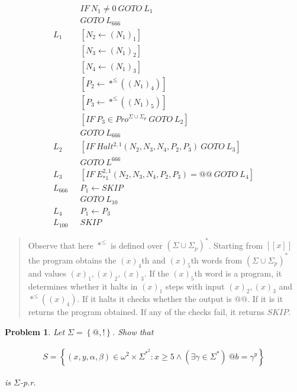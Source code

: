 \documentclass[a4paper, 12pt]{article}
\newtheorem{problem}{Problem}
\newtheorem{problem}{Problem}
\begin{document}
\footnotesize 
\begin{align*}
    &IF~ N_1 \neq 0 ~ GOTO ~ L_1 \\ 
    &GOTO ~ L_{666} \\ 
    L_1 ~ ~ ~&[N_2 \leftarrow  (N_1)_1] \\ 
    &[N_3 \leftarrow  (N_1)_2] \\ 
    &[N_4 \leftarrow  (N_1)_3] \\ 
    &[P_2 \leftarrow  *^{\leq}( (N_1)_4 )] \\ 
    &[P_3 \leftarrow  *^{\leq}( (N_1)_5 )] \\ 
    &[IF ~ P_3 \in Pro^{\Sigma \cup \Sigma_p} ~ GOTO ~ L_2] \\ 
    &GOTO ~ L_{666} \\ 
    L_2 ~ ~ ~ &[IF ~ Halt^{2, 1}(N_2, N_3, N_4, P_2, P_3) ~ GOTO ~ L_3]\\ 
    &GOTO ~ L^{666}\\
    L_3 ~ ~ ~&[IF ~ E_{* 1}^{2, 1}(N_2, N_3, N_4, P_2, P_3) = @@ ~ GOTO ~ L_4]
    \\ 
    L_{666} ~ ~ ~ &P_1 \leftarrow SKIP \\ 
              &GOTO ~ L_{10} \\ 
    L_4 ~ ~ ~ & P_1 \leftarrow P_3 \\ 
    L_{100} ~ ~ ~ &SKIP
\end{align*}

\normalsize


\small
\begin{quote}

    Observe that here $*^{\leq}$ is defined over $(\Sigma \cup \Sigma_p)^*$.
    Starting from $[\![ x ]\!]$ the
    program obtains the  $(x)_4$th and $(x)_5$th words from $(\Sigma \cup
    \Sigma_p)^{*}$ and values $(x)_1, (x)_2, (x)_3$. If the $(x)_5$th word is a
    program, it determines whether it halts in $(x)_1$ steps with input $(x)_2,
    (x)_3$ and $*^{\leq}\left( (x)_4 \right) $. If it halts it checks whether
    the output is $@@$. If it is it returns the program obtained. If any of the
    checks fail, it returns $SKIP$.

\end{quote}
\normalsize

\pagebreak 

\begin{problem}
    Let $\Sigma = \left\{ @, ! \right\} $. Show that

    \begin{align*}
        S = \left\{ (x, y, \alpha, \beta) \in \omega^2 \times \Sigma^{*}^2 : x
        \geq 5 \land (\exists \gamma \in \Sigma^{*})~@b = \gamma^{y} \right\} 
    \end{align*}

    is $\Sigma$-p.r. 
\end{problem}
\end{document}
